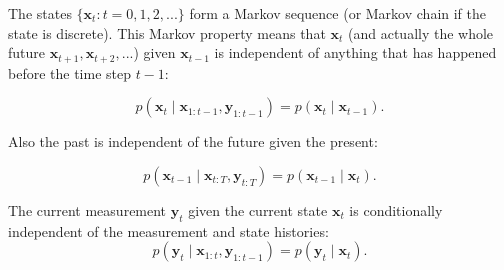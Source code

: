\begin{property}
The states $\{\mathbf{x}_t: t = 0,1,2,...\}$ form a Markov sequence (or Markov chain if the state is discrete). This Markov property means that $\mathbf{x}_t$ (and actually the whole future $\mathbf{x}_{t+1}, \mathbf{x}_{t+2},...$) given $\mathbf{x}_{t-1}$ is independent of anything that has happened before the time step $t-1$: 

\begin{equation}\label{eq: Markov property of states}
   p(\mathbf{x}_t\mid \mathbf{x}_{1:t-1},\mathbf{y}_{1:t-1} )=  p(\mathbf{x}_t\mid \mathbf{x}_{t-1}).
\end{equation}

\noindent Also the past is independent of the future given the present: 

\begin{equation}
   p(\mathbf{x}_{t-1}\mid \mathbf{x}_{t:T},\mathbf{y}_{t:T} )=  p(\mathbf{x}_{t-1}\mid \mathbf{x}_t).
\end{equation}
\end{property}

\begin{property}
The current measurement $\mathbf{y}_t$ given the current state $\mathbf{x}_t$ is conditionally independent of the measurement and state histories: 
\begin{equation}\label{eq: Conditional independence of measurements}
p(\mathbf{y}_t \mid \mathbf{x}_{1:t}, \mathbf{y}_{1:t-1}) = p(\mathbf{y}_t \mid \mathbf{x}_t).    
\end{equation}
\end{property}


